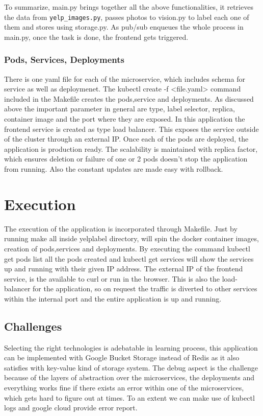To summarize, main.py brings together all the above functionalities,
it retrieves the data from \verb|yelp_images.py|, passes photos to
vision.py to label each one of them and stores using storage.py. As
pub/sub enqueues the whole process in main.py, once the task is done,
the frontend gets triggered.
  
\subsubsection{Pods, Services, Deployments} 

There is one yaml file for each of the microservice, which includes
schema for service as well as deploymenet. The
kubectl create -f <file.yaml> command included in the Makefile
creates the pods,service and deployments. As discussed above the
important parameter in general are type, label selector, replica,
container image and the port where they are exposed.  In this
application the frontend service is created as type load
balancer. This exposes the service outside of the cluster through an
external IP. Once each of the pods are deployed, the application is
production ready. The scalability is maintained with replica factor,
which ensures deletion or failure of one or 2 pods doesn’t stop the
application from running. Also the constant updates are made easy with
rollback.
  
\section{Execution}

The execution of the application is incorporated through
Makefile. Just by running make all inside yelplabel directory, will
spin the docker container images, creation of pods,services and
deployments. By executing the command kubectl get pods list all the
pods created and kubectl get services will show the services up and
running with their given IP address. The external IP of the frontend
service, is the available to curl or run in the browser. This is also
the load-balancer for the application, so on request the traffic is
diverted to other services within the internal port and the entire
application is up and running.
  
\subsection{Challenges} 

Selecting the right technologies is adebatable in learning process,
this application can be implemented with Google Bucket Storage instead
of Redis as it also satisfies with key-value kind of storage
system. The debug aspect is the challenge because of the layers of
abstraction over the microservices, the deployments and everything
works fine if there exists an error within one of the microservices,
which gets hard to figure out at times. To an extent we can make use
of kubectl logs and google cloud provide error report.
  
